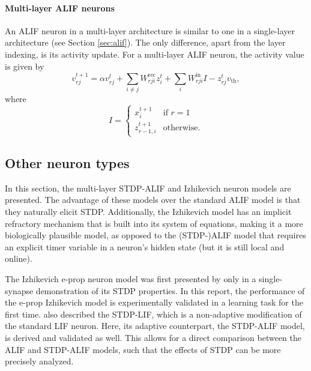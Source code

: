         \paragraph{Multi-layer ALIF neurons}
        An ALIF neuron in a multi-layer architecture is similar to one in a single-layer architecture (see Section \ref{sec:alif}).
        The only difference, apart from the layer indexing, is its activity update.
        For a multi-layer ALIF neuron, the activity value is given by
        \begin{equation}\label{eq:ml_alifV}
        v^{t+1}_{rj} = \alpha v_{rj}^t + \sum_{i\neq j}W^\text{rec}_{rji}z_i^t + \sum_i W^\text{in}_{rji}I - z_{rj}^tv_
        \text{th},
        \end{equation}
        where
        \begin{equation}\label{eq:inpVml}
        I = \begin{cases}
        	x^{t+1}_i       &\mbox{if } r = 1 \\
            z^{t+1}_{r-1,i} &\mbox{otherwise.}
            \end{cases}
        \end{equation}


	\subsection{Other neuron types}

		In this section, the multi-layer STDP-ALIF and Izhikevich neuron models are presented.
		The advantage of these models over the standard ALIF model is that they naturally elicit STDP.
		Additionally, the Izhikevich model has an implicit refractory mechanism that is built into its system of equations, making it a more biologically plausible model, as opposed to the (STDP-)ALIF model that requires an explicit timer variable in a neuron's hidden state (but it is still local and online).

		The Izhikevich e-prop neuron model was first presented by \citet{traub2020learning} only in a single-synapse demonstration of its STDP properties.
		In this report, the performance of the e-prop Izhikevich model is experimentally validated in a learning task for the first time.
		\citet{traub2020learning} also described the STDP-LIF, which is a non-adaptive modification of the standard LIF neuron.
		Here, its adaptive counterpart, the STDP-ALIF model, is derived and validated as well.
		This allows for a direct comparison between the ALIF and STDP-ALIF models, such that the effects of STDP can be more precisely analyzed.

